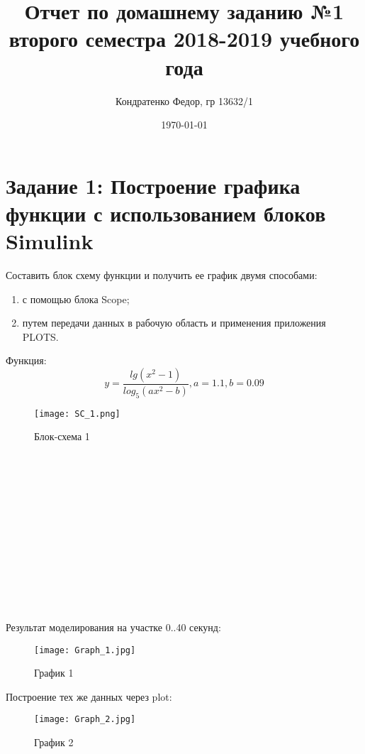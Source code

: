 \documentclass{article}
\author{Кондратенко Федор, гр 13632/1}
\title{Отчет по домашнему заданию №1 второго семестра 2018-2019 учебного года}
\date{\today}
\begin{document}
\maketitle
\section*{Задание 1:  Построение графика функции с использованием блоков Simulink}
Составить блок схему функции и получить ее график двумя способами:
\begin{enumerate} 
    \item {с помощью блока Scope;}
    \item {путем передачи данных в рабочую область и применения приложения PLOTS.}
\end{enumerate}
Функция: $$ y = \frac{lg(x^2 - 1)}{log_5(ax^2 - b)}, a = 1.1, b = 0.09 $$

\begin{figure}[!h]
	
	\centering
	
	\texttt{[image: SC\_1.png]}
	
	\caption{Блок-схема 1}
	
	\label{fig:mpr}
	
\end{figure}
~\\
~\\\\
~\\
~\\\\
~\\
~\\\\
~\\
~\\\\

Результат моделирования на участке 0..40 секунд:\\

\begin{figure}[!h]
	
	\centering
	
	\texttt{[image: Graph\_1.jpg]}
	
	\caption{График 1}
	
	\label{fig:mpr}
	
\end{figure}


Построение тех же данных через plot:

\begin{figure}[h!]
	\centering
	\texttt{[image: Graph\_2.jpg]}
	\caption{График 2}
	\label{fig:mpr}
\end{figure}
\end{document}
